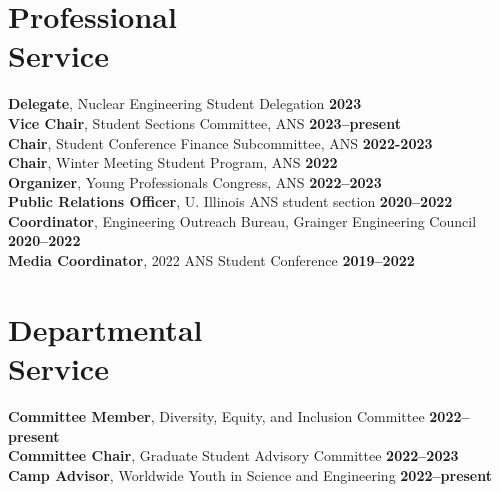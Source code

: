 \documentclass[margin,line]{resume}
\begin{document}
\begin{resume}
    \section{\mysidestyle Professional\\Service}
    \textbf{Delegate}, Nuclear Engineering Student Delegation \hfill \textbf{2023}\vspace{.5mm}\\%
    \textbf{Vice Chair}, Student Sections Committee, ANS \hfill \textbf{2023--present}\vspace{.5mm}\\%
    \textbf{Chair}, Student Conference Finance Subcommittee, ANS \hfill \textbf{2022-2023}\vspace{.5mm}\\%
                \textbf{Chair}, Winter Meeting Student Program, ANS \hfill \textbf{2022}\vspace{.5mm}\\%
    \textbf{Organizer}, Young Professionals Congress, ANS \hfill \textbf{2022--2023}\vspace{.5mm}\\%
                \textbf{Public Relations Officer}, U. Illinois ANS student section  \hfill \textbf{2020--2022}\vspace{.5mm}\\%
    \textbf{Coordinator}, Engineering Outreach Bureau, Grainger Engineering Council \hfill \textbf{2020--2022}\vspace{.5mm}\\%
                \textbf{Media Coordinator}, 2022 ANS Student Conference \hfill \textbf{2019--2022}\vspace{.5mm}\\%
    \section{\mysidestyle Departmental\\Service}
                \textbf{Committee Member}, Diversity, Equity, and Inclusion Committee \hfill \textbf{2022--present}\vspace{.5mm}\\%
                \textbf{Committee Chair}, Graduate Student Advisory Committee \hfill \textbf{2022--2023}\vspace{.5mm}\\%
                \textbf{Camp Advisor}, Worldwide Youth in Science and Engineering \hfill \textbf{2022--present}\vspace{.5mm}\\%


\end{resume}
\end{document}
